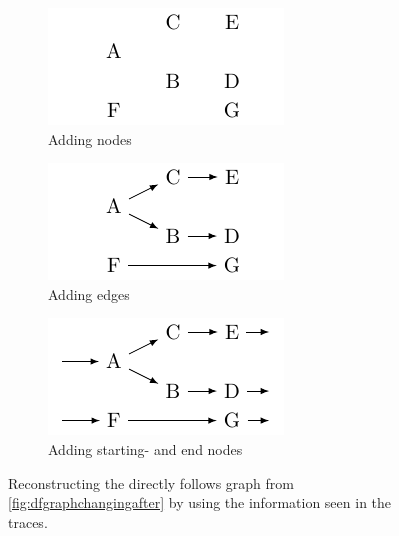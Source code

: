 \documentclass[
	a4paper,
	pagesize,
	pdftex,
	12pt,
	twoside, %
	BCOR=5mm, %
	ngerman,
	fleqn,
	final,
	]{scrartcl}
\begin{document}
\begin{figure}[h]
	\begin{subfigure}[t]{.32\textwidth}
	  \centering
	  \includegraphics[width=.9\linewidth]{img/nodes.pdf}
	  \caption{Adding nodes}
	\end{subfigure}%
	\begin{subfigure}[t]{.32\textwidth}
	  \centering
	  \includegraphics[width=.9\linewidth]{img/nodes_edges.pdf}
	  \caption{Adding edges}
	\end{subfigure}
	\begin{subfigure}[t]{.32\textwidth}
	  \centering
	  \includegraphics[width=.9\linewidth]{img/nodes_start_end_edges.pdf}
	  \caption{Adding starting- and end nodes}
	\end{subfigure}
	\caption{Reconstructing the directly follows graph from \ref{fig:dfgraphchangingafter} by using the information seen in the traces.}
	\label{fig:dfgraphbuilding}
\end{figure}
\end{document}
